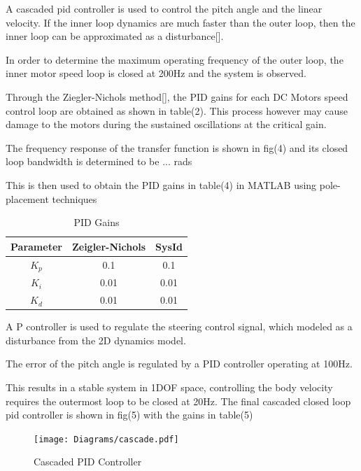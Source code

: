         A cascaded pid controller is used to control the pitch angle and the linear velocity. 
        If the inner loop dynamics are much faster than the outer loop, 
        then the inner loop can be approximated as a disturbance[].

        In order to determine the maximum operating frequency of the outer loop, 
        the inner motor speed loop is closed at 200Hz and the system is observed.
        
        Through the Ziegler-Nichols method[], the PID gains for each DC Motors speed control loop 
        are obtained as shown in table(2). This process however may cause damage to the motors 
        during the sustained oscillations at the critical gain. 
       
        The frequency response of the transfer function is shown in fig(4) 
        and its closed loop bandwidth is determined to be ... rads

        This is then used to obtain the PID gains in table(4) in MATLAB using pole-placement techniques
        \begin{table}[H]
            \centering
            \begin{tabular}{|c|c|c|}
                \hline
                Parameter & Zeigler-Nichols & SysId \\
                \hline 
                $K_p$ & 0.1 & 0.1 \\
                $K_i$ & 0.01 & 0.01 \\
                $K_d$ & 0.01 & 0.01 \\
                \hline
            \end{tabular}
            \caption{PID Gains}
        \end{table}

        A P controller is used to regulate the steering control signal, which modeled
        as a disturbance from the 2D dynamics model.

        The error of the pitch angle is regulated by a PID controller operating at 100Hz. 
        
        This results in a stable system in 1DOF space, controlling the body velocity requires the outermost loop to be closed at 20Hz.
        The final cascaded closed loop pid controller is shown in fig(5) with the gains in table(5)

        \begin{figure}[H]
            \texttt{[image: Diagrams/cascade.pdf]}
            \caption{Cascaded PID Controller}
        \end{figure}

